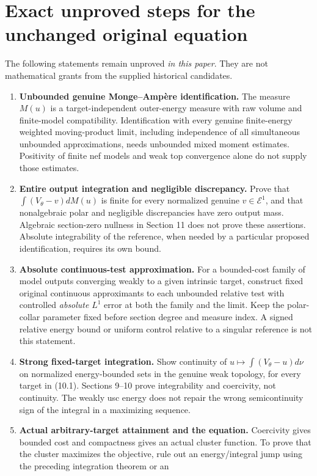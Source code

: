 \documentclass[10pt]{article}
\newcommand{\E}{\mathcal E}
\begin{document}
\section{Exact unproved steps for the unchanged original equation}
The following statements remain unproved \emph{in this paper}. They are
not mathematical grants from the supplied historical candidates.
\begin{enumerate}
\item \textbf{Unbounded genuine Monge--Amp\`ere identification.}
The measure $M(u)$ is a target-independent outer-energy measure with raw
volume and finite-model compatibility. Identification with every genuine
finite-energy weighted moving-product limit, including independence of
all simultaneous unbounded approximations, needs unbounded mixed moment
estimates. Positivity of finite nef models and weak top convergence alone
do not supply those estimates.
\item \textbf{Entire output integration and negligible discrepancy.}
Prove that $\int(V_\theta-v)dM(u)$ is finite for every normalized genuine
$v\in\E^1$, and that nonalgebraic polar and negligible discrepancies have
zero output mass. Algebraic section-zero nullness in Section 11 does not
prove these assertions. Absolute integrability of the reference, when
needed by a particular proposed identification, requires its own bound.
\item \textbf{Absolute continuous-test approximation.}
For a bounded-cost family of model outputs converging weakly to a given
intrinsic target, construct fixed original continuous approximants to
each unbounded relative test with controlled \emph{absolute} $L^1$ error
at both the family and the limit. Keep the polar-collar parameter fixed
before section degree and measure index. A signed relative energy bound
or uniform control relative to a singular reference is not this statement.
\item \textbf{Strong fixed-target integration.}
Show continuity of $u\mapsto\int(V_\theta-u)d\nu$ on normalized
energy-bounded sets in the genuine weak topology, for every target in
(10.1). Sections 9--10 prove integrability and coercivity, not continuity.
The weakly usc energy does not repair the wrong semicontinuity sign of
the integral in a maximizing sequence.
\item \textbf{Actual arbitrary-target attainment and the equation.}
Coercivity gives bounded cost and compactness gives an actual cluster
function. To prove that the cluster maximizes the objective, rule out
an energy/integral jump using the preceding integration theorem or an

\end{enumerate}
\end{document}
